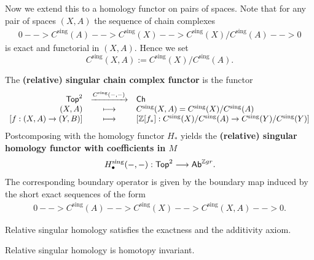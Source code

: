 	Now we extend this to a homology functor on pairs of spaces. Note that for any pair of spaces $(X,A)$ the sequence of chain complexes
	\begin{align*}
		0 --> C^\text{sing}(A) --> C^\text{sing}(X) --> C^\text{sing}(X)/C^\text{sing}(A) --> 0
	\end{align*}
	is exact and functorial in $(X,A)$. Hence we set
	\begin{equation*}
		C^\text{sing}(X,A) := C^\text{sing}(X)/C^\text{sing}(A).
	\end{equation*}

	\begin{definition}
		The \textbf{(relative) singular chain complex functor} is the functor
		\begin{equation*}
			\begin{array}{rcl}
				\textsf{Top}^2 & \xrightarrow{C^\text{sing}(-,-)} & \textsf{Ch}\\
				(X,A) & \longmapsto & C^\text{sing}(X,A) = C^\text{sing}(X)/C^\text{sing}(A)\\
				{[f:(X,A)\rightarrow(Y,B)]} & \longmapsto & {[\mathbb{Z}[f_{*}]:C^\text{sing}(X)/C^\text{sing}(A) \rightarrow C^\text{sing}(Y) / C^\text{sing}(Y)]}
			\end{array}
		\end{equation*}
		Postcomposing with the homology functor $H_{*}$ yields the \textbf{(relative) singular homology functor with coefficients in $M$}
		\begin{align*}
			H_\bullet^\text{sing}(-,-): \textsf{Top}^2 --> \textsf{Ab}^{\mathbb{Z} gr}.
		\end{align*}
		The corresponding boundary operator is given by the boundary map induced by the short exact sequences of the form
		\begin{align*}
			0 --> C^\text{sing}(A) --> C^\text{sing}(X) --> C^\text{sing}(X,A) --> 0.
		\end{align*}
	\end{definition}


	\begin{lemma}
		Relative singular homology satisfies the exactness and the additivity axiom.
	\end{lemma}

	\begin{proposition}
		Relative singular homology is homotopy invariant.
	\end{proposition}

